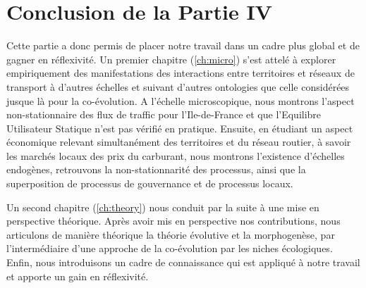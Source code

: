 





\chapter*{Conclusion de la Partie IV}













Cette partie a donc permis de placer notre travail dans un cadre plus global et de gagner en réflexivité. Un premier chapitre (\ref{ch:micro}) s'est attelé à explorer empiriquement des manifestations des interactions entre territoires et réseaux de transport à d'autres échelles et suivant d'autres ontologies que celle considérées jusque là pour la co-évolution. A l'échelle microscopique, nous montrons l'aspect non-stationnaire des flux de traffic pour l'Ile-de-France et que l'Equilibre Utilisateur Statique n'est pas vérifié en pratique. Ensuite, en étudiant un aspect économique relevant simultanément des territoires et du réseau routier, à savoir les marchés locaux des prix du carburant, nous montrons l'existence d'échelles endogènes, retrouvons la non-stationnarité des processus, ainsi que la superposition de processus de gouvernance et de processus locaux.

Un second chapitre (\ref{ch:theory}) nous conduit par la suite à une mise en perspective théorique. Après avoir mis en perspective nos contributions, nous articulons de manière théorique la théorie évolutive et la morphogenèse, par l'intermédiaire d'une approche de la co-évolution par les niches écologiques. Enfin, nous introduisons un cadre de connaissance qui est appliqué à notre travail et apporte un gain en réflexivité.



